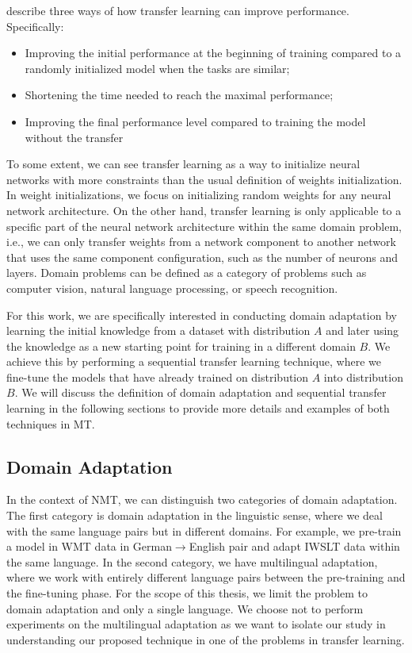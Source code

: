  describe three ways of how transfer learning can improve performance. Specifically:
\begin{itemize}
    \item Improving the initial performance at the beginning of training compared
          to a randomly initialized model when the tasks are similar;
    \item Shortening the time needed to reach the maximal performance;
    \item Improving the final performance level compared to training the model
          without the transfer
\end{itemize}

To some extent, we can see transfer learning as a way to initialize neural networks with more constraints than the usual definition of weights initialization. In weight initializations, we focus on initializing random weights for any neural network architecture. On the other hand, transfer learning is only applicable to a specific part of the neural network architecture within the same domain problem, i.e., we can only transfer weights from a network component to another network that uses the same component configuration, such as the number of neurons and layers. Domain problems can be defined as a category of problems such as computer vision, natural language processing, or speech recognition.

For this work, we are specifically interested in conducting domain adaptation by learning the initial knowledge from a dataset with distribution $A$ and later using the knowledge as a new starting point for training in a different domain $B$. We achieve this by performing a sequential transfer learning technique, where we fine-tune the models that have already trained on distribution $A$ into distribution $B$. We will discuss the definition of domain adaptation and sequential transfer learning in the following sections to provide more details and examples of both techniques in MT.

\subsection{Domain Adaptation}
\label{sec:domain_adapt}
In the context of NMT, we can distinguish two categories of domain adaptation. The first category is domain adaptation in the linguistic sense, where we deal with the same language pairs but in different domains. For example, we pre-train a model in WMT data in German$\rightarrow$English pair and adapt IWSLT data within the same language. In the second category, we have multilingual adaptation, where we work with entirely different language pairs between the pre-training and the fine-tuning phase. For the scope of this thesis, we limit the problem to domain adaptation and only a single language. We choose not to perform experiments on the multilingual adaptation as we want to isolate our study in understanding our proposed technique in one of the problems in transfer learning.

